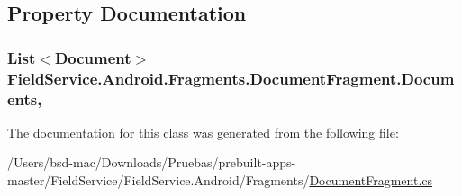 \subsection{Property Documentation}
\hypertarget{class_field_service_1_1_android_1_1_fragments_1_1_document_fragment_a8dbf584b8597e3d0ef1f6ecf57339c5d}{
\subsubsection[{Documents}]{\setlength{\rightskip}{0pt plus 5cm}List$<${\bf Document}$>$ Field\+Service.\+Android.\+Fragments.\+Document\+Fragment.\+Documents\hspace{0.3cm}{\ttfamily [get]}, {\ttfamily [set]}}}\label{class_field_service_1_1_android_1_1_fragments_1_1_document_fragment_a8dbf584b8597e3d0ef1f6ecf57339c5d}


The documentation for this class was generated from the following file\+:\begin{DoxyCompactItemize}
\item 
/\+Users/bsd-\/mac/\+Downloads/\+Pruebas/prebuilt-\/apps-\/master/\+Field\+Service/\+Field\+Service.\+Android/\+Fragments/\hyperlink{_document_fragment_8cs}{Document\+Fragment.\+cs}\end{DoxyCompactItemize}
